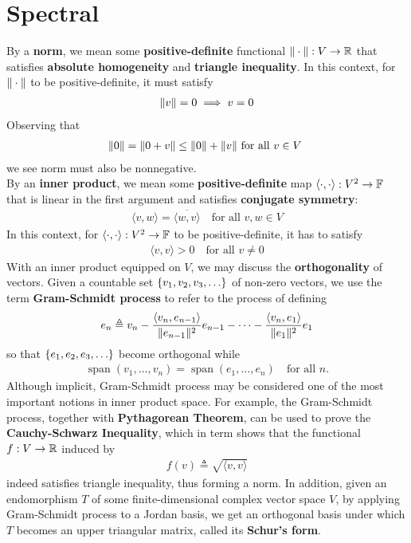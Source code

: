 \documentclass{report}
\begin{document}
\section{Spectral}
\begin{mdframed}
  By a \textbf{norm}, we mean some \textbf{positive-definite} functional $\| \cdot \|:V\to \mathbb{R}$ that satisfies \textbf{absolute homogeneity} and \textbf{triangle inequality}. In this context, for $\| \cdot \|$ to be positive-definite, it must satisfy 
\begin{align*}
  \| v \|=0 \implies  v=0
\end{align*}
Observing that  
\begin{align*}
\| 0 \|=\| 0+v \|\leq \| 0 \|+\| v \|\text{ for all $v\in V$ }
\end{align*}
we see norm must also be nonnegative.\\

By an \textbf{inner product}, we mean some \textbf{positive-definite}  map $\langle \cdot,\cdot\rangle : V^2 \rightarrow \mathbb{F}$ that is linear in the first argument and satisfies \textbf{conjugate symmetry}: 
\begin{align*}
\langle v,w\rangle = \overline{\langle w,v\rangle }\quad\text{for all }v,w \in V
\end{align*}
In this context, for $\langle \cdot,\cdot\rangle :V^2\rightarrow \mathbb{F}$ to be positive-definite, it has to satisfy 
\begin{align*}
\langle v,v\rangle >0\quad\text{for all }v\neq 0
\end{align*}
With an inner product equipped on $V$, we may discuss the  \textbf{orthogonality} of vectors. Given a countable set  $\set{v_1,v_2,v_3,\dots }$ of non-zero vectors, we use the term \textbf{Gram-Schmidt process} to refer to the process of defining 
\begin{align*}
e_n \triangleq v_n - \frac{\langle v_{n},e_{n-1}\rangle }{\| e_{n-1} \|^2}e_{n-1} - \cdots - \frac{\langle v_n,e_1\rangle }{\| e_1 \|^2}e_1
\end{align*}
so that $\set{e_1,e_2,e_3,\dots}$ become orthogonal while 
\begin{align*}
\operatorname{span}(v_1,\dots ,v_n)=\operatorname{span}(e_1,\dots ,e_n)\quad\text{for all }n.
\end{align*}
Although implicit, Gram-Schmidt process may be considered one of the most important notions in inner product space. For example, the Gram-Schmidt process, together with \textbf{Pythagorean Theorem}, can be used to prove the \textbf{Cauchy-Schwarz Inequality}, which in term shows that the functional $f:V\rightarrow \mathbb{R}$ induced by 
\begin{align*}
f(v)\triangleq \sqrt{\langle v,v\rangle }  
\end{align*}
indeed satisfies triangle inequality, thus forming a norm. In addition, given an endomorphism $T$ of some finite-dimensional complex vector space $V$, by applying Gram-Schmidt process to a Jordan basis, we get an orthogonal basis under which $T$ becomes an upper triangular matrix, called its \textbf{Schur's form}.\\


\end{mdframed}
\end{document}
